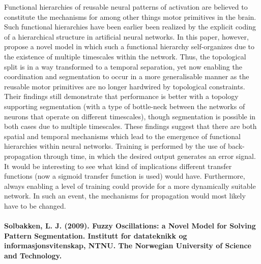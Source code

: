 Functional hierarchies of reusable neural patterns of activation are believed to constitute the mechanisms for among other things motor primitives in the brain. Such functional hierarchies have been earlier been realized by the explicit coding of a hierarchical structure in artificial neural networks. In this paper, however, \cite{Yamashita2008} propose a novel model in which such a functional hierarchy self-organizes due to the existence of multiple timescales within the network. Thus, the topological split is in a way transformed to a temporal separation, yet now enabling the coordination and segmentation to occur in a more generalisable manner as the reusable motor primitives are no longer hardwired by topological constraints. Their findings still demonstrate that performance is better with a topology supporting segmentation (with a type of bottle-neck between the networks of neurons that operate on different timescales), though segmentation is possible in both cases due to multiple timescales. These findings suggest that there are both spatial and temporal mechanisms which lead to the emergence of functional hierarchies within neural networks. Training is performed by the use of back-propagation through time, in which the desired output generates an error signal. It would be interesting to see what kind of implications different transfer functions (now a sigmoid transfer function is used) would have. Furthermore, always enabling a level of training could provide for a more dynamically suitable network. In such an event, the mechanisms for propagation would most likely have to be changed.
\\
\\
\textbf{Solbakken, L. J. (2009). Fuzzy Oscillations: a Novel Model for Solving Pattern Segmentation. Institutt for datateknikk og informasjonsvitenskap, NTNU. The Norwegian University of Science and Technology.}

